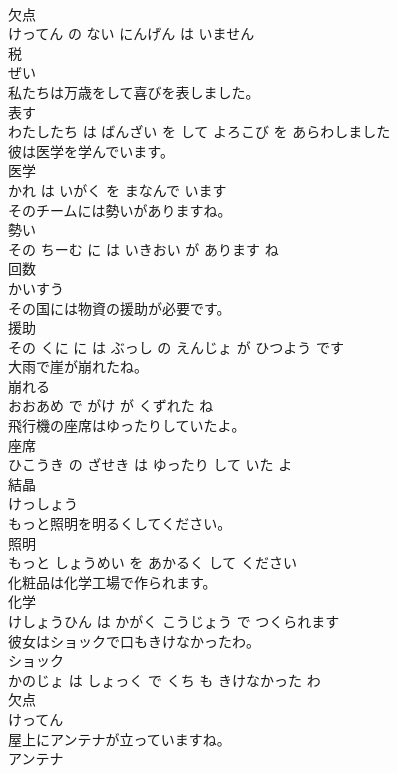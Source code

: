 \documentclass[8pt]{extreport}
\begin{document}
\begin{CJK}{UTF8}{min}
\\	欠点 
\\	けってん の ない にんげん は いません			
\\	税	
\\	ぜい		
\\	私たちは万歳をして喜びを表しました。	
\\	表す 
\\	わたしたち は ばんざい を して よろこび を あらわしました			
\\	彼は医学を学んでいます。	
\\	医学 
\\	かれ は いがく を まなんで います			
\\	そのチームには勢いがありますね。	
\\	勢い 
\\	その ちーむ に は いきおい が あります ね			
\\	回数	
\\	かいすう		
\\	その国には物資の援助が必要です。	
\\	援助 
\\	その くに に は ぶっし の えんじょ が ひつよう です			
\\	大雨で崖が崩れたね。	
\\	崩れる 
\\	おおあめ で がけ が くずれた ね			
\\	飛行機の座席はゆったりしていたよ。	
\\	座席 
\\	ひこうき の ざせき は ゆったり して いた よ			
\\	結晶	
\\	けっしょう		
\\	もっと照明を明るくしてください。	
\\	照明 
\\	もっと しょうめい を あかるく して ください			
\\	化粧品は化学工場で作られます。	
\\	化学 
\\	けしょうひん は かがく こうじょう で つくられます			
\\	彼女はショックで口もきけなかったわ。	
\\	ショック 
\\	かのじょ は しょっく で くち も きけなかった わ			
\\	欠点	
\\	けってん		
\\	屋上にアンテナが立っていますね。	
\\	アンテナ 

\end{CJK}
\end{document}
